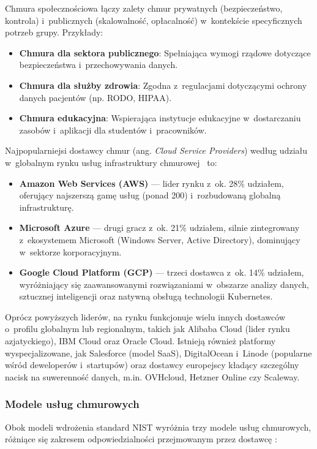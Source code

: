 \begin{description}[style=nextline, font=\bfseries]
          Chmura społecznościowa łączy zalety chmur prywatnych (bezpieczeństwo, kontrola) i~publicznych (skalowalność, opłacalność) w~kontekście specyficznych potrzeb grupy. Przykłady:
          \begin{itemize}[leftmargin=*]
              \item \textbf{Chmura dla sektora publicznego}: Spełniająca wymogi rządowe dotyczące bezpieczeństwa i~przechowywania danych.
              \item \textbf{Chmura dla służby zdrowia}: Zgodna z~regulacjami dotyczącymi ochrony danych pacjentów (np. RODO, HIPAA).
              \item \textbf{Chmura edukacyjna}: Wspierająca instytucje edukacyjne w~dostarczaniu zasobów i~aplikacji dla studentów i~pracowników.
          \end{itemize}
\end{description}

Najpopularniejsi dostawcy chmur (ang. \textit{Cloud Service Providers}) według udziału w~globalnym rynku usług infrastruktury chmurowej~\cite{SynergyCloudMarketShare2026} to:
\begin{itemize}
    \item \textbf{Amazon Web Services (AWS)} --- lider rynku z~ok. 28\% udziałem, oferujący najszerszą gamę usług (ponad 200) i~rozbudowaną globalną infrastrukturę.
    \item \textbf{Microsoft Azure} --- drugi gracz z~ok. 21\% udziałem, silnie zintegrowany z~ekosystemem Microsoft (Windows Server, Active Directory), dominujący w~sektorze korporacyjnym.
    \item \textbf{Google Cloud Platform (GCP)} --- trzeci dostawca z~ok. 14\% udziałem, wyróżniający się zaawansowanymi rozwiązaniami w~obszarze analizy danych, sztucznej inteligencji oraz natywną obsługą technologii Kubernetes.
\end{itemize}

Oprócz powyższych liderów, na rynku funkcjonuje wielu innych dostawców o~profilu globalnym lub regionalnym, takich jak Alibaba Cloud (lider rynku azjatyckiego), IBM Cloud oraz Oracle Cloud. Istnieją również platformy wyspecjalizowane, jak Salesforce (model SaaS), DigitalOcean i~Linode (popularne wśród deweloperów i~startupów) oraz dostawcy europejscy kładący szczególny nacisk na suwerenność danych, m.in. OVHcloud, Hetzner Online czy Scaleway.

\subsubsection{Modele usług chmurowych}
Obok modeli wdrożenia standard NIST wyróżnia trzy modele usług chmurowych, różniące się zakresem odpowiedzialności przejmowanym przez dostawcę \cite{Mell2011NISTCloudDefinition}:

